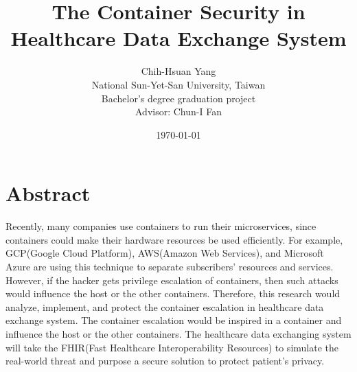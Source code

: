 \documentclass[12pt,a4paper]{IEEEconf}
\title{{The Container Security in Healthcare Data Exchange System}}
\author{Chih-Hsuan Yang\\
National Sun-Yet-San University, Taiwan \\
Bachelor's degree graduation project \\
Advisor: Chun-I Fan
}
\date{\today}
\begin{document}
\maketitle



\section{Abstract}
Recently, many companies use containers to run their microservices, since containers could
make their hardware resources be used efficiently. For example, GCP(Google Cloud Platform),
AWS(Amazon Web Services), and Microsoft Azure are using this technique to separate subscribers'
resources and services. However, if the hacker gets privilege escalation of containers, then
such attacks would influence the host or the other containers.
Therefore, this research would analyze, implement, and protect the container escalation in
healthcare data exchange system.
The container escalation would be inspired in a container and influence the host or the
other containers. The healthcare data exchanging system will take the FHIR(Fast
Healthcare Interoperability Resources)\cite{FHIR_home} to simulate the real-world threat and
purpose a secure solution to protect patient's privacy.

\end{document}
